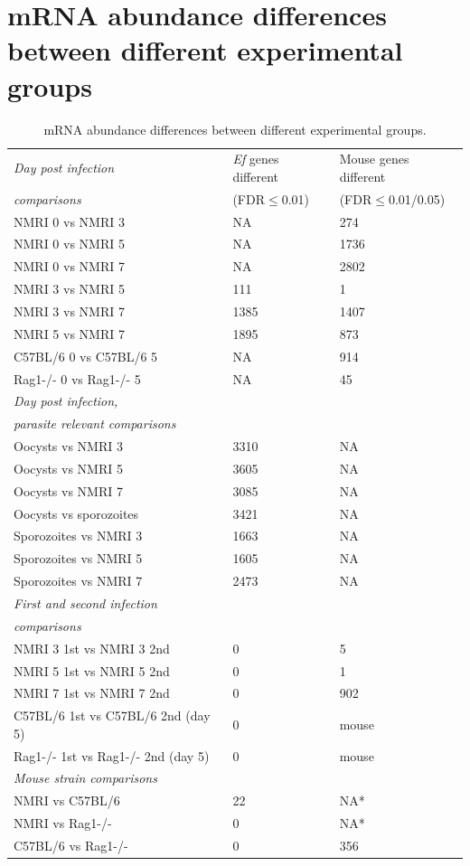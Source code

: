 \documentclass{bmcart}
\begin{document}
\section{mRNA abundance differences between different experimental groups}
\setlength{\tabcolsep}{8pt}
\begin{table}[H]
\small
\begin{center}
\caption{mRNA abundance differences between different experimental groups.}
\begin{tabular}{*3l}    \toprule
\textit{Day post infection} & \textit{Ef} genes different & Mouse genes different \\ 
	\textit{comparisons} 	    & (FDR$\leq$0.01) &  (FDR$\leq$0.01/0.05) \\ \midrule
	NMRI 0 vs NMRI 3		& NA   & 274 \\
	NMRI 0 vs NMRI 5		& NA   & 1736 \\
	NMRI 0 vs NMRI 7		& NA   & 2802 \\
	NMRI 3 vs NMRI 5     		& 111  & 1 \\
	NMRI 3 vs NMRI 7  		& 1385 & 1407 \\ 
	NMRI 5 vs NMRI 7  		& 1895 & 873 \\ 
	C57BL/6 0 vs C57BL/6 5		& NA	& 914 \\
	Rag1-/- 0 vs Rag1-/- 5		& NA	& 45 \\ \midrule
\textit{Day post infection,} & 		 & 		 \\ 
\textit{parasite relevant comparisons} 	    & 		&  \\ \midrule
	Oocysts vs NMRI 3  	& 3310 & NA \\  
	Oocysts vs NMRI 5	& 3605 & NA \\ 
	Oocysts vs NMRI 7	& 3085 & NA \\ 
	Oocysts vs sporozoites  & 3421 & NA \\
	Sporozoites vs NMRI 3 	& 1663 & NA \\
	Sporozoites vs NMRI 5 	& 1605 & NA \\
	Sporozoites vs NMRI 7 	& 2473 & NA \\ 
\textit{First and second infection} & 		 & 	 \\ 
\textit{comparisons} 	    & 		& 	\\ \midrule
	NMRI 3 1st vs NMRI 3 2nd  	& 0  & 5 \\
	NMRI 5 1st vs NMRI 5 2nd  	& 0  & 1 \\
	NMRI 7 1st vs NMRI 7 2nd  	& 0  & 902 \\
	C57BL/6 1st vs C57BL/6 2nd (day 5) & 0 &  mouse \\
	Rag1-/- 1st vs Rag1-/- 2nd (day 5) & 0 & mouse  \\ \midrule
\textit{Mouse strain comparisons} & 		 & 	 \\ \midrule
	NMRI vs C57BL/6 		& 22 	& NA* \\		
	NMRI vs Rag1-/-     		& 0 & NA* 	\\
	C57BL/6 vs Rag1-/-  		& 0   & 356 	\\ \midrule
\bottomrule
	\hline
\end{tabular}
\end{center}
\end{table}
\end{document}
